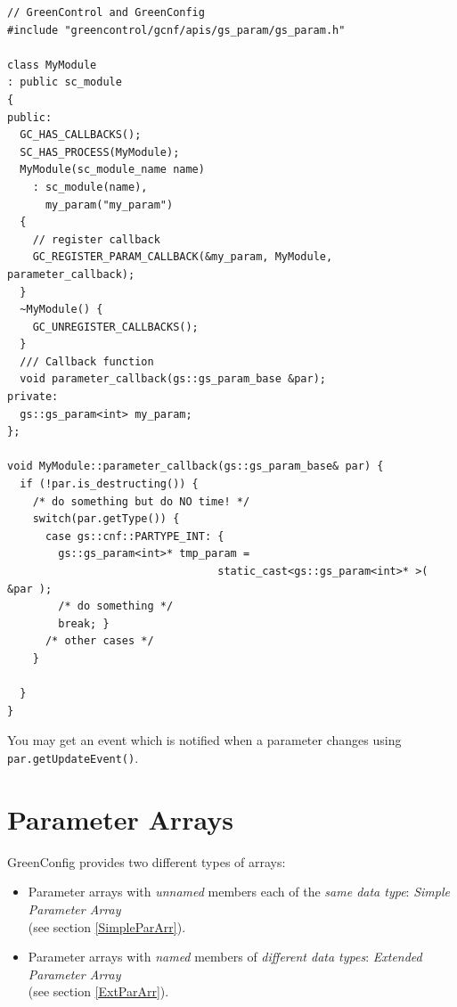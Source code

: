 \begin{minipage}{\textwidth}

\begin{lstlisting}
// GreenControl and GreenConfig
#include "greencontrol/gcnf/apis/gs_param/gs_param.h"

class MyModule
: public sc_module
{
public:
  GC_HAS_CALLBACKS();
  SC_HAS_PROCESS(MyModule);
  MyModule(sc_module_name name)
    : sc_module(name),
      my_param("my_param")
  {
    // register callback
    GC_REGISTER_PARAM_CALLBACK(&my_param, MyModule, parameter_callback);
  }
  ~MyModule() {
    GC_UNREGISTER_CALLBACKS();
  }
  /// Callback function
  void parameter_callback(gs::gs_param_base &par);
private:
  gs::gs_param<int> my_param;
};

void MyModule::parameter_callback(gs::gs_param_base& par) {
  if (!par.is_destructing()) {
    /* do something but do NO time! */
    switch(par.getType()) {
      case gs::cnf::PARTYPE_INT: {
        gs::gs_param<int>* tmp_param = 
                                 static_cast<gs::gs_param<int>* >( &par );
        /* do something */
        break; }
      /* other cases */
    }

  } 
}
\end{lstlisting}
\end{minipage}


 \newline 
You may get an event which is notified when a parameter changes using \lstinline|par.getUpdateEvent()|. \\




\newpage
\section{Parameter Arrays}
\label{ParameterArrays}

GreenConfig provides two different types of arrays:
\begin{itemize}
    \item Parameter arrays with \textsl{unnamed} members each of the \textsl{same data type}: {\em Simple Parameter Array}\\
     (see section \ref{SimpleParArr}).
    \item Parameter arrays with \textsl{named} members of \textsl{different data types}: {\em Extended Parameter Array} \\
    (see section \ref{ExtParArr}).
\end{itemize}

